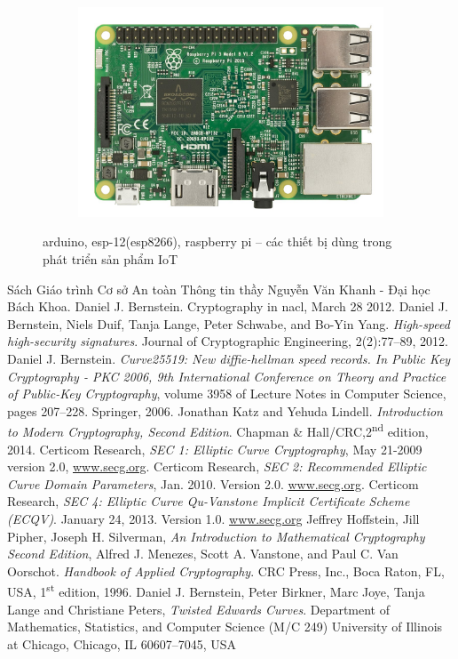 \documentclass[a4paper,12pt]{report}
\begin{document}
\begin{figure}[h]
\begin{subfigure}{.3\textwidth}
  \includegraphics[width=1\linewidth]{../ras.jpg}
  \label{fig:sfig2}
\end{subfigure}
\caption{arduino, esp-12(esp8266), raspberry pi – các thiết bị dùng trong phát triển sản phẩm IoT} \label{h6.3}
\end{figure}

\printindex
\begin{thebibliography}{9}
 Sách Giáo trình Cơ sở An toàn Thông tin thầy Nguyễn Văn Khanh - Đại học Bách Khoa.
 Daniel J. Bernstein. Cryptography in nacl, March 28 2012.
 Daniel J. Bernstein, Niels Duif, Tanja Lange, Peter Schwabe, and Bo-Yin Yang. \textit{High-speed high-security signatures}. Journal of Cryptographic Engineering, 2(2):77–89, 2012.
 Daniel J. Bernstein. \textit{Curve25519: New diffie-hellman speed records. In Public Key Cryptography - PKC 2006, 9th International Conference on Theory and Practice of Public-Key Cryptography}, volume 3958 of Lecture Notes in Computer Science, pages 207–228. Springer, 2006.
 Jonathan Katz and Yehuda Lindell. \textit{Introduction to Modern Cryptography, Second Edition}. Chapman \& Hall/CRC,2\textsuperscript{nd} edition, 2014.
 Certicom Research, \textit{SEC 1: Elliptic Curve Cryptography}, May 21-2009 version 2.0, \url{www.secg.org}.
Certicom Research, \textit{SEC 2: Recommended Elliptic Curve Domain Parameters}, Jan. 2010. Version 2.0. \url{www.secg.org}.
 Certicom Research, \textit{SEC 4: Elliptic Curve Qu-Vanstone Implicit Certificate Scheme (ECQV)}. January 24, 2013. Version 1.0. \url{www.secg.org}
Jeffrey Hoffstein, Jill Pipher, Joseph H. Silverman, \textit{An Introduction to Mathematical Cryptography  Second Edition},  
 Alfred J. Menezes, Scott A. Vanstone, and Paul C. Van Oorschot. \textit{Handbook of Applied Cryptography}. CRC Press, Inc., Boca Raton, FL, USA, 1\textsuperscript{st} edition, 1996.
 Daniel J. Bernstein, Peter Birkner, Marc Joye, Tanja Lange and Christiane Peters, \textit{Twisted Edwards Curves}. Department of Mathematics, Statistics, and Computer Science (M/C 249) University of Illinois at Chicago, Chicago, IL 60607–7045, USA
\end{thebibliography}
\end{document}
